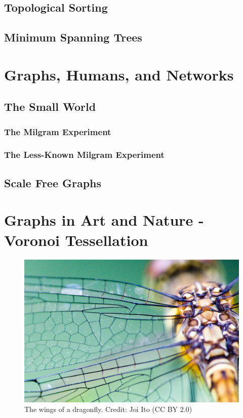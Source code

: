\documentclass[10pt,a4paper]{book}
\begin{document}
\subsection{Topological Sorting}
\subsection{Minimum Spanning Trees}


\section{Graphs, Humans, and Networks}

\subsection{The Small World}
\subsubsection{The Milgram Experiment}
\subsubsection{The Less-Known Milgram Experiment}

\subsection{Scale Free Graphs}


\section{Graphs in Art and Nature - Voronoi Tessellation}

\begin{figure}
	\centering
	\includegraphics[width=0.7\linewidth]{pics/dragonfly_wing_joi_ito}
	\caption{The wings of a dragonfly. Credit: Joi Ito (CC BY 2.0)}
	\label{fig:dragonflywingjoiito}
\end{figure}
\end{document}
